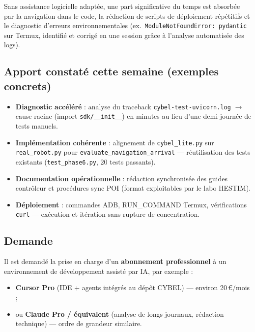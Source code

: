 \documentclass[11pt,a4paper]{article}
\begin{document}
Sans assistance logicielle adaptée, une part significative du temps est absorbée par la navigation dans le code, la rédaction de scripts de déploiement répétitifs et le diagnostic d'erreurs environnementales (ex.\ \texttt{ModuleNotFoundError: pydantic} sur Termux, identifié et corrigé en une session grâce à l'analyse automatisée des logs).

\subsection{Apport constaté cette semaine (exemples concrets)}

\begin{itemize}[noitemsep]
  \item \textbf{Diagnostic accéléré} : analyse du traceback \texttt{cybel-test-uvicorn.log} $\rightarrow$ cause racine (import \texttt{sdk/\_\_init\_\_}) en minutes au lieu d'une demi-journée de tests manuels.
  \item \textbf{Implémentation cohérente} : alignement de \texttt{cybel\_lite.py} sur \texttt{real\_robot.py} pour \texttt{evaluate\_navigation\_arrival} — réutilisation des tests existants (\texttt{test\_phase6.py}, 20 tests passants).
  \item \textbf{Documentation opérationnelle} : rédaction synchronisée des guides contrôleur et procédures sync POI (format exploitables par le labo HESTIM).
  \item \textbf{Déploiement} : commandes ADB, RUN\_COMMAND Termux, vérifications \texttt{curl} — exécution et itération sans rupture de concentration.
\end{itemize}

\subsection{Demande}

Il est demandé la prise en charge d'un \textbf{abonnement professionnel} à un environnement de développement assisté par IA, par exemple :

\begin{itemize}[noitemsep]
  \item \textbf{Cursor Pro} (IDE + agents intégrés au dépôt CYBEL) — environ 20\,€/mois ;
  \item ou \textbf{Claude Pro / équivalent} (analyse de longs journaux, rédaction technique) — ordre de grandeur similaire.
\end{itemize}
\end{document}
